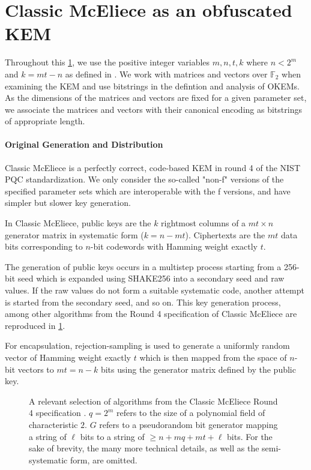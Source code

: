 \section{Classic McEliece as an obfuscated KEM} \label{sec:obfuscating-classic-mceliece}

Throughout this \cref{sec:obfuscating-classic-mceliece}, we use the positive integer variables $m,n,t,k$ where $n < 2^m$ and $k=mt-n$ as defined in \cite{NISTPQC-R4:ClassicMcEliece22}. We work with matrices and vectors over $\mathbb F_2$ when examining the KEM and use bitstrings in the defintion and analysis of OKEMs. As the dimensions of the matrices and vectors are fixed for a given parameter set, we associate the matrices and vectors with their canonical encoding as bitstrings of appropriate length.

\paragraph{Original Generation and Distribution}
Classic McEliece \cite{NISTPQC-R4:ClassicMcEliece22} is a perfectly correct, code-based KEM in round 4 of the NIST PQC standardization. We only consider the so-called "non-f" versions of the specified parameter sets which are interoperable with the f versions, and have simpler but slower key generation.

In Classic McEliece, public keys are the $k$ rightmost columns of a $mt \times n$ generator matrix in systematic form ($k = n - mt$). Ciphertexts are the $mt$ data bits corresponding to $n$-bit codewords with Hamming weight exactly $t$.

The generation of public keys occurs in a multistep process starting from a 256-bit seed which is expanded using SHAKE256 into a secondary seed and raw values. If the raw values do not form a suitable systematic code, another attempt is started from the secondary seed, and so on. This key generation process, among other algorithms from the Round 4 specification of Classic McEliece are reproduced in \cref{fig:classic-mceliece-spec}.

For encapsulation, rejection-sampling is used to generate a uniformly random vector of Hamming weight exactly $t$ which is then mapped from the space of $n$-bit vectors to $mt=n-k$ bits using the generator matrix defined by the public key.

\begin{figure}
    
    \caption{A relevant selection of algorithms from the Classic McEliece Round 4 specification \cite{NISTPQC-R4:ClassicMcEliece22}. $q=2^m$ refers to the size of a polynomial field of characteristic $2$. $G$ refers to a pseudorandom bit generator mapping a string of $\ell$ bits to a string of $\geq n + mq + mt + \ell$ bits. For the sake of brevity, the many more technical details, as well as the semi-systematic form, are omitted.}
    \label{fig:classic-mceliece-spec}
\end{figure}

